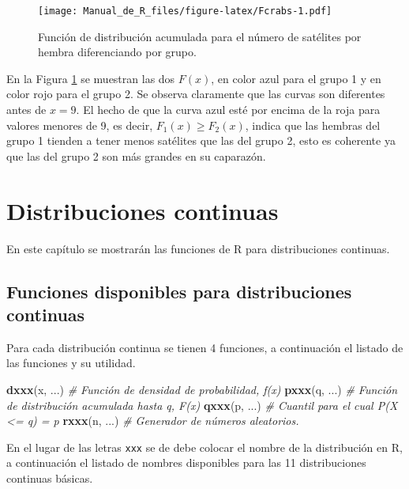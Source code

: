 \documentclass[10pt,]{krantz}
\makeatletter
\newenvironment{Shaded}{\begin{snugshade}}{\end{snugshade}}
\newcommand{\KeywordTok}[1]{\textcolor[rgb]{0.13,0.29,0.53}{\textbf{{#1}}}}
\newcommand{\CommentTok}[1]{\textcolor[rgb]{0.56,0.35,0.01}{\textit{{#1}}}}
\newcommand{\NormalTok}[1]{{#1}}
\let\proglang=\textsf
\newenvironment{kframe}{%
\medskip{}
\setlength{\fboxsep}{.8em}
 \def\at@end@of@kframe{}%
 \ifinner\ifhmode%
  \def\at@end@of@kframe{\end{minipage}}%
  \begin{minipage}{\columnwidth}%
 \fi\fi%
 \def\FrameCommand##1{\hskip\@totalleftmargin \hskip-\fboxsep
 \colorbox{shadecolor}{##1}\hskip-\fboxsep
     \hskip-\linewidth \hskip-\@totalleftmargin \hskip\columnwidth}%
 \MakeFramed {\advance\hsize-\width
   \@totalleftmargin\z@ \linewidth\hsize
   \@setminipage}}%
 {\par\unskip\endMakeFramed%
 \at@end@of@kframe}
\renewenvironment{Shaded}{\begin{kframe}}{\end{kframe}}
\makeatother
\begin{document}
\begin{figure}[htbp]
\centering
\texttt{[image: Manual\_de\_R\_files/figure-latex/Fcrabs-1.pdf]}
\caption{\label{fig:Fcrabs}Función de distribución acumulada para el número
de satélites por hembra diferenciando por grupo.}
\end{figure}

En la Figura \ref{fig:Fcrabs} se muestran las dos \(F(x)\), en color
azul para el grupo 1 y en color rojo para el grupo 2. Se observa
claramente que las curvas son diferentes antes de \(x=9\). El hecho de
que la curva azul esté por encima de la roja para valores menores de 9,
es decir, \(F_1(x) \geq F_2(x)\), indica que las hembras del grupo 1
tienden a tener menos satélites que las del grupo 2, esto es coherente
ya que las del grupo 2 son más grandes en su caparazón.

\chapter{\texorpdfstring{Distribuciones continuas
\label{continuas}}{Distribuciones continuas }}\label{distribuciones-continuas}

En este capítulo se mostrarán las funciones de \proglang{R} para
distribuciones continuas.

\section{Funciones disponibles para distribuciones
continuas}\label{funciones-disponibles-para-distribuciones-continuas}

Para cada distribución continua se tienen 4 funciones, a continuación el
listado de las funciones y su utilidad.

\begin{Shaded}
\begin{Highlighting}[]
\KeywordTok{dxxx}\NormalTok{(x, ...)  }\CommentTok{# Función de densidad de probabilidad, f(x)}
\KeywordTok{pxxx}\NormalTok{(q, ...)  }\CommentTok{# Función de distribución acumulada hasta q, F(x)}
\KeywordTok{qxxx}\NormalTok{(p, ...)  }\CommentTok{# Cuantil para el cual P(X <= q) = p}
\KeywordTok{rxxx}\NormalTok{(n, ...)  }\CommentTok{# Generador de números aleatorios.}
\end{Highlighting}
\end{Shaded}

En el lugar de las letras \texttt{xxx} se de debe colocar el nombre de
la distribución en \proglang{R}, a continuación el listado de nombres
disponibles para las 11 distribuciones continuas básicas.
\end{document}
